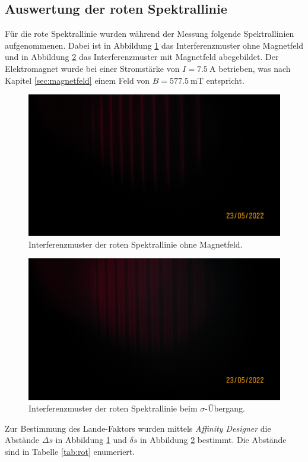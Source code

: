 \subsection{Auswertung der roten Spektrallinie}
\label{sec:rot}
Für die rote Spektrallinie wurden während der Messung folgende Spektrallinien aufgenommenen. Dabei ist 
in Abbildung \ref{fig:rot} das Interferenzmuster ohne Magnetfeld und in Abbildung \ref{fig:rot_sigma}
das Interferenzmuster mit Magnetfeld abegebildet. Der Elektromagnet wurde bei einer Stromstärke von 
$I=\SI{7.5}{\ampere}$ betrieben, was nach Kapitel \ref{sec:magnetfeld} einem Feld von 
$B=\SI{577.5}{\milli\tesla}$ entspricht.

\begin{figure}[H]
    \centering
    \includegraphics[scale= 0.2]{Messung/Rot[6].JPG}
    \caption{Interferenzmuster der roten Spektrallinie ohne Magnetfeld.}
    \label{fig:rot}
\end{figure}
\noindent

\begin{figure}[H]
    \centering
    \includegraphics[scale= 0.2]{Messung/Rot_Sigma[7].JPG}
    \caption{Interferenzmuster der roten Spektrallinie beim $\sigma$-Übergang.}
    \label{fig:rot_sigma}
\end{figure}
\noindent
Zur Bestimmung des Lande-Faktors wurden mittels \textit{Affinity Designer} \cite{affinity} die Abstände $\Delta s$ 
in Abbildung \ref{fig:rot} und $\delta s$ in Abbildung \ref{fig:rot_sigma} bestimmt. Die Abstände sind in 
Tabelle \ref{tab:rot} enumeriert.

